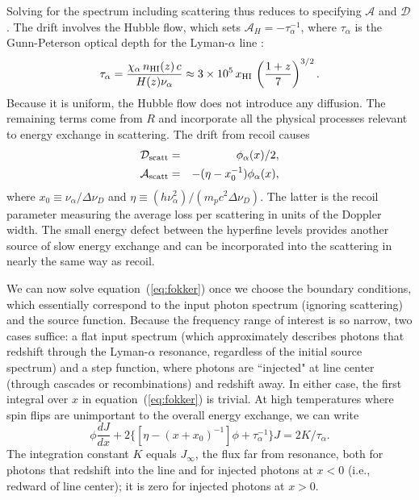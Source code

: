 \documentclass[a4paper,openany, 12pt]{book}
\begin{document}
Solving for the spectrum including scattering thus reduces to specifying ${\mathcal A}$ and ${\mathcal D}$.  The drift involves the Hubble flow, which sets ${\mathcal A}_H= - \tau_\alpha^{-1}$, where $\tau_\alpha$ is the Gunn-Peterson optical depth for the Lyman-$\alpha$ line \cite{gunn65, scheuer65}:
\begin{equation}
\tau_{\alpha} = \frac{\chi_\alpha \, n_{\rm HI}(z) \, c}{H(z) \nu_\alpha} \approx 3 \times 10^5 \, x_{\rm HI} \, \left( \frac{1+z}{7} \right)^{3/2}.
\label{eq:taugp}
\end{equation}
Because it is uniform, the Hubble flow does not introduce any diffusion. The remaining terms come from $R$ and
incorporate all the physical processes relevant to energy exchange in scattering.  The drift from recoil causes \cite{hirata06}
\begin{eqnarray}
{\mathcal D}_{\rm scatt} & = & \phi_\alpha(x)/2,
\label{eq:Dkin} \\
{\mathcal A}_{\rm scatt} & = &  -(\eta - x_0^{-1} ) \phi_\alpha(x),
\label{eq:Akin}
\end{eqnarray}
where $x_0 \equiv \nu_\alpha/\Delta \nu_D$ and $\eta \equiv (h \nu_\alpha^2)/(m_p c^2 \Delta \nu_D)$.  The latter is the recoil parameter measuring the average loss per scattering in units of the Doppler width.  The small energy defect between the hyperfine levels provides another source of slow energy exchange \cite{hirata06} and can be incorporated into the scattering in nearly the same way as recoil.

We can now solve equation~(\ref{eq:fokker}) once we choose the boundary conditions, which essentially correspond to the input photon spectrum (ignoring scattering) and the source function.  Because the
frequency range of interest is so narrow, two cases suffice: a flat input spectrum (which approximately describes photons that redshift through the Lyman-$\alpha$ resonance, regardless of the initial source spectrum)
and a step function, where photons are ``injected" at line center (through cascades or recombinations) and redshift away.  In either case, the first integral over $x$ in equation~(\ref{eq:fokker}) is trivial. At high temperatures where spin flips are unimportant to the overall energy exchange, we can write
\begin{equation}
\phi \frac{d J}{d x} + 2 \{ [\eta - (x + x_0)^{-1}] \phi + \tau_\alpha^{-1} \} J = 2 K / \tau_\alpha.
\label{eq:fokk-simp}
\end{equation}
The integration constant $K$ equals $J_\infty$, the flux far from resonance, both for photons that redshift into the line and for injected photons at $x<0$ (i.e., redward of line center); it is zero for injected photons at $x>0$.  
\end{document}
